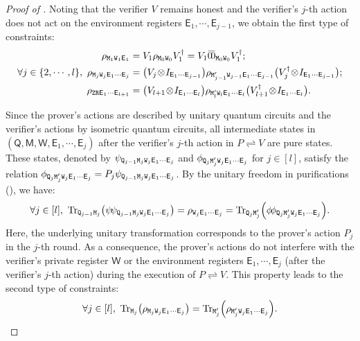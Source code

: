 \documentclass[11pt, a4paper]{article}
\numberwithin{equation}{section}
\numberwithin{figure}{section}
\newcommand{\protocol}[2]{{#1}\!\rightleftharpoons\!{#2}}
\DeclarePairedDelimiter\rbra{\lparen}{\rparen}
\let\ket\relax\DeclarePairedDelimiter\ket{\lvert}{\rangle}
\let\bra\relax\DeclarePairedDelimiter\bra{\langle}{\rvert}
\newcommand{\ketbra}[2]{\ensuremath{\ket{#1}\!\bra{#2}}}
\newcommand{\Tr}{\mathrm{Tr}}
\newcommand{\sfE}{\mathsf{E}}
\newcommand{\sfM}{\mathsf{M}}
\newcommand{\sfQ}{\mathsf{Q}}
\newcommand{\sfW}{\mathsf{W}}
\newcommand{\ttM}{\mathtt{M}}
\newcommand{\ttQ}{\mathtt{Q}}
\newcommand{\ttR}{\mathtt{R}}
\newcommand{\ttW}{\mathtt{W}}
\newcommand{\ttZ}{\mathtt{Z}}
\begin{document}
\begin{proof}[Proof of ]
    Noting that the verifier $V$ remains honest and the verifier's $j$-th action does not act on the environment registers $\sfE_1,\cdots,\sfE_{j-1}$, we obtain the first type of constraints:
    \begin{equation}
        \label{eq:QIPUL-honest-verifier-cond}
        \begin{aligned}
            \rho_{\ttM_1\ttW_1\sfE_1} &= V_1 \rho_{\ttM_{0}\ttW_{0}} V_1^{\dagger} = V_1 \ketbra{\bar{0}}{\bar{0}}_{\ttM_0\ttW_0} V_1^{\dagger};\\
        \forall j \in \{2,\cdots,l\},~\rho_{\ttM_j\ttW_j\sfE_1\cdots\sfE_j} &= \big(V_j \!\otimes\! I_{\sfE_1\cdots\sfE_{j-1}} \big) \rho_{\ttM'_{j-1}\ttW_{j-1}\sfE_1\cdots\sfE_{j-1}} \big( V_j^{\dagger} \!\otimes\! I_{\sfE_1\cdots\sfE_{j-1}}  \big);\\
        \rho_{\ttZ\ttR\sfE_1\cdots\sfE_{l+1}} &= \big( V_{l+1} \!\otimes\! I_{\sfE_1\cdots\sfE_l} \big) \rho_{\ttM'_l\ttW_l\sfE_1\cdots\sfE_l} \big(V_{l+1}^{\dagger} \!\otimes\! I_{\sfE_1\cdots\sfE_l} \big).
        \end{aligned}
    \end{equation}

    Since the prover's actions are described by unitary quantum circuits and the verifier's actions by isometric quantum circuits, all intermediate states in $(\sfQ, \sfM, \sfW, \sfE_1, \cdots, \sfE_j)$ after the verifier's $j$-th action in $\protocol{P}{V}$ are pure states. These states, denoted by $\ket{\psi}_{\ttQ_{j-1}\ttM_j\ttW_j\sfE_1\cdots\sfE_j}$ and $\ket{\phi}_{\ttQ_{j}\ttM'_j\ttW_j\sfE_1\cdots\sfE_j}$ for $j \in [l]$, satisfy the relation
    $\ket{\phi}_{\ttQ_{j}\ttM'_j\ttW_j\sfE_1\cdots\sfE_j} = P_j \ket{\psi}_{\ttQ_{j-1}\ttM_j\ttW_j\sfE_1\cdots\sfE_j}$.
    By the unitary freedom in purifications (), we have:
    \begin{equation*}
        \forall j \in [l],~\Tr_{\ttQ_{j-1}\ttM_j}\rbra*{\ketbra{\psi}{\psi}_{\ttQ_{j-1}\ttM_j\ttW_j\sfE_1\cdots\sfE_j}} = \rho_{\ttW_j\sfE_1\cdots\sfE_j} = \Tr_{\ttQ_{j}\ttM'_j}\rbra*{\ketbra{\phi}{\phi}_{\ttQ_{j}\ttM'_j\ttW_j\sfE_1\cdots\sfE_j}}.
    \end{equation*}
    Here, the underlying unitary transformation corresponds to the prover's action $P_j$ in the $j$-th round. 
    As a consequence, the prover's actions do not interfere with the verifier's private register $\sfW$ or the environment registers $\sfE_1, \cdots, \sfE_j$ (after the verifier's $j$-th action) during the execution of $\protocol{P}{V}$. 
    This property leads to the second type of constraints: 
    \begin{equation}
        \label{eq:QIPUL-prover-actions-cond}
        \forall j \in [l],~\Tr_{\ttM_j}\rbra*{\rho_{\ttM_j\ttW_j\sfE_1\cdots\sfE_j}} = \Tr_{\ttM'_j}\rbra*{\rho_{\ttM'_j\ttW_j\sfE_1\cdots\sfE_j}}.
    \end{equation}


\end{proof}
\end{document}
